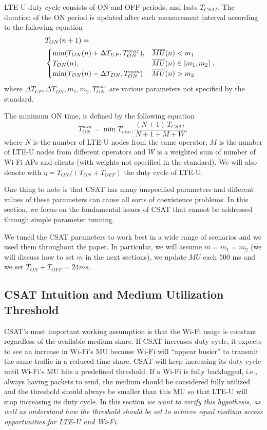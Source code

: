 LTE-U duty cycle consists of ON and OFF periods, and lasts $T_{CSAT}$. 
The duration of the ON period is updated after each measurement interval according to the following equation
\begin{eqnarray}
\lefteqn{T_{ON}(n+1) = } \label{eq:csat_update}\\
 & \begin{cases}
    \min ( T_{ON}(n) + \Delta T_{UP}, T^{max}_{ON}), & \overline{MU}(n) < m_1 \\
    T_{ON}(n), & \overline{MU}(n) \in [m_1, m_2] \\
    \min ( T_{ON}(n) - \Delta T_{DN}, T^{min}_{ON}) & \overline{MU}(n) > m_2 \\
  \end{cases}, \nonumber
\end{eqnarray}
where $\Delta T_{UP}, \Delta T_{DN}, m_1, m_2, T^{max}_{ON}$ are various parameters not specified by the standard. 

The minimum ON time, is defined by the following equation
$$
T^{min}_{ON} = \min{T_{min}, \frac{(N+1) \, T_{CSAT}}{N+1+M+W}},
$$
where $N$ is the number of LTE-U nodes from the same operator, $M$ is the number of LTE-U nodes from different operators and $W$ is a weighted sum of number of Wi-Fi APs and clients (with weights not specified in the standard). 
We will also denote with $\eta = T_{ON} / (T_{ON} + T_{OFF})$ the duty cycle of LTE-U.

One thing to note is that CSAT has many unspecified parameters and different values of these parameters can cause all sorts of coexistence problems. In this section, we focus on the fundamental issues of CSAT that cannot be addressed through simple parameter tunning. 

We tuned the CSAT parameters to work best in a wide range of scenarios and we used them throughout the paper. 
In particular, we will assume $m = m_1 = m_2$ (we will discuss how to set $m$ in the next sections), we update $MU$ each 500 ms and we set $T_{ON} + T_{OFF} = 24ms$.







\subsection{CSAT Intuition and Medium Utilization Threshold}
\label{sec:csat_mu}


CSAT's most important working assumption is that the Wi-Fi usage is constant regardless of the available medium share. 
If CSAT increases duty cycle, it expects to see an increase in Wi-Fi’s MU because Wi-Fi will “appear busier” to transmit the same traffic in a reduced time share. 
CSAT will keep increasing its duty cycle until Wi-Fi’s MU hits a predefined threshold. 
If a Wi-Fi is fully backlogged, i.e., always having packets to send, the medium should be considered fully utilized and the threshold should always be smaller than this MU so that LTE-U will stop increasing its duty cycle. 
In this section {\em we want to verify this hypothesis, as well as understand how the threshold should be set to achieve equal medium access opportunities for LTE-U and Wi-Fi}.

